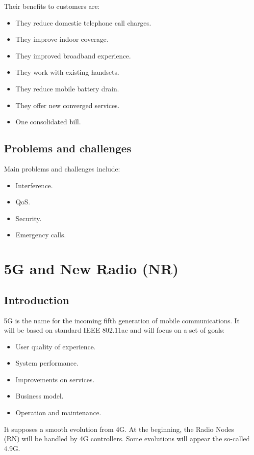 \documentclass[../main.tex]{subfiles}
\begin{document}
Their benefits to customers are:
\begin{itemize}
	\item They reduce domestic telephone call charges.
	\item They improve indoor coverage.
	\item They improved broadband experience.
	\item They work with existing handsets.
	\item They reduce mobile battery drain.
	\item They offer new converged services.
	\item One consolidated bill.
\end{itemize}

\subsection{Problems and challenges}

Main problems and challenges include:
\begin{itemize}
	\item Interference.
	\item QoS.
	\item Security.
	\item Emergency calls.
\end{itemize}

\section{5G and New Radio (NR)}

\subsection{Introduction}

5G is the name for the incoming fifth generation of mobile communications. It will be based on standard IEEE 802.11ac and will focus on a set of goals:
\begin{itemize}
	\item User quality of experience.
	\item System performance.
	\item Improvements on services.
	\item Business model.
	\item Operation and maintenance.
\end{itemize}

It supposes a smooth evolution from 4G. At the beginning, the Radio Nodes (RN) will be handled by 4G controllers. Some evolutions will appear the so-called 4.9G.
\end{document}
